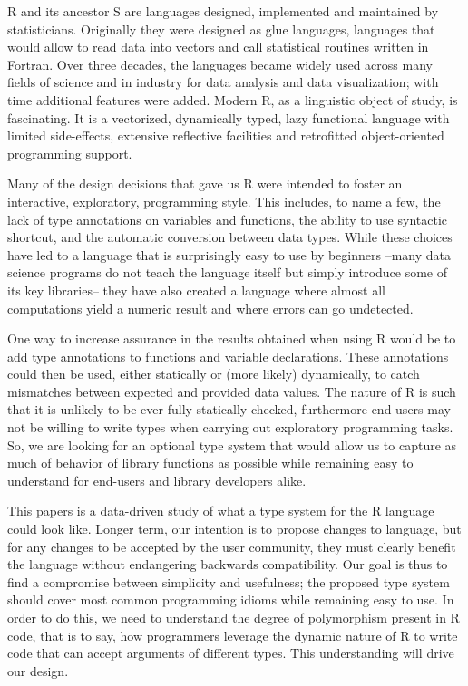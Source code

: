 \documentclass[acmsmall,10pt,review,anonymous]{acmart}\settopmatter{printfolios=true,printccs=false,printacmref=false}
\begin{document}
R and its ancestor S are languages designed, implemented and maintained by
statisticians. Originally they were designed as glue languages, languages
that would allow to read data into vectors and call statistical routines
written in Fortran. Over three decades, the languages became widely used
across many fields of science and in industry for data analysis and data
visualization; with time additional features were added.  Modern R, as a
linguistic object of study, is fascinating. It is a vectorized, dynamically
typed, lazy functional language with limited side-effects, extensive
reflective facilities and retrofitted object-oriented programming support.

Many of the design decisions that gave us R were intended to foster an
interactive, exploratory, programming style. This includes, to name a few,
the lack of type annotations on variables and functions, the ability to use
syntactic shortcut, and the automatic conversion between data types.  While
these choices have led to a language that is surprisingly easy to use by
beginners --many data science programs do not teach the language itself but
simply introduce some of its key libraries-- they have also created a
language where almost all computations yield a numeric result and where
errors can go undetected. 

One way to increase assurance in the results obtained when using R would be
to add type annotations to functions and variable declarations. These
annotations could then be used, either statically or (more likely)
dynamically, to catch mismatches between expected and provided data values.
The nature of R is such that it is unlikely to be ever fully statically
checked, furthermore end users may not be willing to write types when
carrying out exploratory programming tasks. So, we are looking for an
optional type system that would allow us to capture as much of behavior of
library functions as possible while remaining easy to understand for
end-users and library developers alike.

This papers is a data-driven study of what a type system for the R language
could look like. Longer term, our intention is to propose changes to
language, but for any changes to be accepted by the user community, they
must clearly benefit the language without endangering backwards
compatibility. Our goal is thus to find a compromise between simplicity and
usefulness; the proposed type system should cover most common programming
idioms while remaining easy to use. In order to do this, we need to
understand the degree of polymorphism present in R code, that is to say, how
programmers leverage the dynamic nature of R to write code that can accept
arguments of different types.  This understanding will drive our design.
\end{document}
